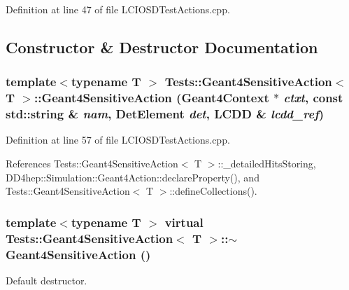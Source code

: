 Definition at line 47 of file LCIOSDTestActions.cpp.

\subsection{Constructor \& Destructor Documentation}
\hypertarget{class_tests_1_1_geant4_sensitive_action_a0ed0ce7ae78a2d675419e5a1241b7570}{
\subsubsection[{Geant4SensitiveAction}]{\setlength{\rightskip}{0pt plus 5cm}template$<$typename T $>$ {\bf Tests::Geant4SensitiveAction}$<$ {\bf T} $>$::{\bf Geant4SensitiveAction} ({\bf Geant4Context} $\ast$ {\em ctxt}, \/  const std::string \& {\em nam}, \/  {\bf DetElement} {\em det}, \/  {\bf LCDD} \& {\em lcdd\_\-ref})}}
\label{class_tests_1_1_geant4_sensitive_action_a0ed0ce7ae78a2d675419e5a1241b7570}


Definition at line 57 of file LCIOSDTestActions.cpp.

References Tests::Geant4SensitiveAction$<$ T $>$::\_\-detailedHitsStoring, DD4hep::Simulation::Geant4Action::declareProperty(), and Tests::Geant4SensitiveAction$<$ T $>$::defineCollections().\hypertarget{class_tests_1_1_geant4_sensitive_action_a64a85815a59aaada8e3f08a8f02eadf1}{
\subsubsection[{$\sim$Geant4SensitiveAction}]{\setlength{\rightskip}{0pt plus 5cm}template$<$typename T $>$ virtual {\bf Tests::Geant4SensitiveAction}$<$ {\bf T} $>$::$\sim${\bf Geant4SensitiveAction} ()}}
\label{class_tests_1_1_geant4_sensitive_action_a64a85815a59aaada8e3f08a8f02eadf1}


Default destructor. 


